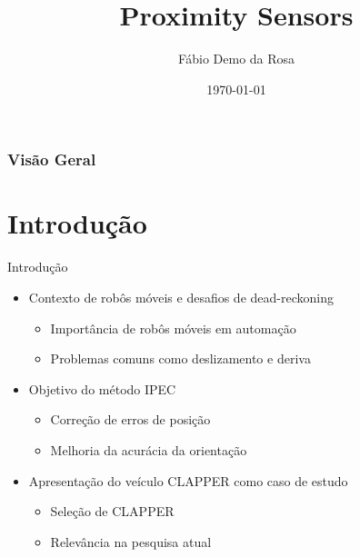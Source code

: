 \documentclass[xcolor=dvipsnames, aspectratio=169]{beamer}
\title[Proximity Sensors]{Proximity Sensors} %
\author[FDR]{Fábio Demo da Rosa} %
\institute[UFSM] %
{
Universidade Federal de Santa Maria \\ %
Pós-Graduação em Ciência da Computação \\
Disciplina de Robótica Móvel\\
\medskip
\textit{faberdemo@gmail.com} %
}
\date{\today} %
\begin{document}
\begin{frame}
\titlepage %
\end{frame}

\begin{frame}
\frametitle{Visão Geral} %
\tableofcontents %
\end{frame}


\section{Introdução}
\begin{frame}{Introdução}
  \begin{itemize}
    \item Contexto de robôs móveis e desafios de dead-reckoning
      \begin{itemize}
        \item Importância de robôs móveis em automação
        \item Problemas comuns como deslizamento e deriva
      \end{itemize}
    \item Objetivo do método IPEC
      \begin{itemize}
        \item Correção de erros de posição
        \item Melhoria da acurácia da orientação
      \end{itemize}
    \item Apresentação do veículo CLAPPER como caso de estudo
      \begin{itemize}
        \item Seleção de CLAPPER
        \item Relevância na pesquisa atual
      \end{itemize}
  \end{itemize}
\end{frame}
\end{document}
